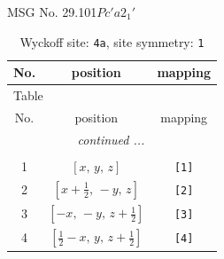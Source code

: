 \documentclass[fleqn,8pt]{jsarticle}
\begin{document}
\setcounter{MaxMatrixCols}{32}

\renewcommand{\tablename}{Table~}
\renewcommand{\figurename}{Figure~}
\begin{center}
\LARGE
MSG No. 29.101\quad$Pc'a2_{1}'$
\end{center}
\renewcommand{\arraystretch}{1.2}
\begin{longtable}{ccc}
\caption{Wyckoff site: {\tt 4a}, site symmetry: {\tt 1}}
 \\
 \hline \hline
No. & position & mapping \\ \hline \endfirsthead

\multicolumn{2}{l}{\tablename\ \thetable{}} \\
 \hline \hline
No. & position & mapping \\ \hline \endhead

 \hline \hline
\multicolumn{2}{r}{\footnotesize\it continued ...} \\ \endfoot

 \hline \hline
\multicolumn{2}{r}{} \\ \endlastfoot

1 & $\left[ x,\, y,\, z \right]$ & {\tt [1]} \\ \hline
2 & $\left[ x + \frac{1}{2},\, - y,\, z \right]$ & {\tt [2]} \\ \hline
3 & $\left[ - x,\, - y,\, z + \frac{1}{2} \right]$ & {\tt [3]} \\ \hline
4 & $\left[ \frac{1}{2} - x,\, y,\, z + \frac{1}{2} \right]$ & {\tt [4]} \\
\end{longtable}
\end{document}

